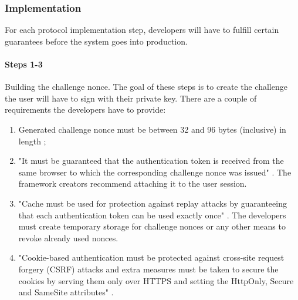


\subsubsection{Implementation}

For each protocol implementation step, developers will have to fulfill certain guarantees before the system goes into production.

\paragraph{Steps 1-3}

Building the challenge nonce. The goal of these steps is to create the challenge the user will have to sign with their private key. There are a couple of requirements the developers have to provide:
\begin{enumerate}
    \item Generated challenge nonce must be between 32 and 96 bytes (inclusive) in length \cite{ria-webeid-source-web-eid-app-authenticate};
    \item "It must be guaranteed that the authentication token is received from the same browser to which the corresponding challenge nonce was issued" \cite{ria-webeid-source-web-eid-authtoken-validation-java-readme}. The framework creators recommend attaching it to the user session.
    \item "Cache must be used for protection against replay attacks by guaranteeing that each authentication token can be used exactly once" \cite{ria-webeid-source-web-eid-authtoken-validation-java-readme}. The developers must create temporary storage for challenge nonces or any other means to revoke already used nonces.
    \item "Cookie-based authentication must be protected against cross-site request forgery (CSRF) attacks and extra measures must be taken to secure the cookies by serving them only over HTTPS and setting the HttpOnly, Secure and SameSite attributes" \cite{ria-webeid-source-web-eid-authtoken-validation-java-readme}.
\end{enumerate}

